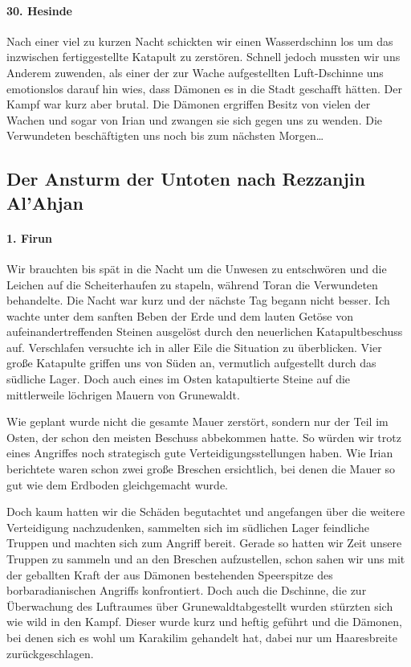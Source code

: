 \paragraph{30. Hesinde}
Nach einer viel zu kurzen Nacht schickten wir einen Wasserdschinn los um das inzwischen fertiggestellte Katapult zu zerstören. Schnell jedoch mussten wir uns Anderem zuwenden, als einer der zur Wache aufgestellten Luft-Dschinne uns emotionslos darauf hin wies, dass Dämonen es in die Stadt geschafft hätten. Der Kampf war kurz aber brutal. Die Dämonen ergriffen Besitz von vielen der Wachen und sogar von Irian und zwangen sie sich gegen uns zu wenden. Die Verwundeten beschäftigten uns noch bis zum nächsten Morgen\dots

\subsection{Der Ansturm der Untoten nach Rezzanjin Al'Ahjan}

\paragraph{1. Firun}
Wir brauchten bis spät in die Nacht um die Unwesen zu entschwören und die Leichen auf die Scheiterhaufen zu stapeln, während Toran die Verwundeten behandelte. Die Nacht war kurz und der nächste Tag begann nicht besser. Ich wachte unter dem sanften Beben der Erde und dem lauten Getöse von aufeinandertreffenden Steinen ausgelöst durch den neuerlichen Katapultbeschuss auf. Verschlafen versuchte ich in aller Eile die Situation zu überblicken. Vier große Katapulte griffen uns von Süden an, vermutlich aufgestellt durch das südliche Lager. Doch auch eines im Osten katapultierte Steine auf die mittlerweile löchrigen Mauern von Grunewaldt. 

Wie geplant wurde nicht die gesamte Mauer zerstört, sondern nur der Teil im Osten, der schon den meisten Beschuss abbekommen hatte. So würden wir trotz eines Angriffes noch strategisch gute Verteidigungsstellungen haben. Wie Irian berichtete waren schon zwei große Breschen ersichtlich, bei denen die Mauer so gut wie dem Erdboden gleichgemacht wurde.

Doch kaum hatten wir die Schäden begutachtet und angefangen über die weitere Verteidigung nachzudenken, sammelten sich im südlichen Lager feindliche Truppen und machten sich zum Angriff bereit. Gerade so hatten wir Zeit unsere Truppen zu sammeln und an den Breschen aufzustellen, schon sahen wir uns mit der geballten Kraft der aus Dämonen bestehenden Speerspitze des borbaradianischen Angriffs konfrontiert. Doch auch die Dschinne, die zur Überwachung des Luftraumes über Grunewaldtabgestellt wurden stürzten sich wie wild in den Kampf. Dieser wurde kurz und heftig geführt und die Dämonen, bei denen sich es wohl um Karakilim gehandelt hat, dabei nur um Haaresbreite zurückgeschlagen. 

